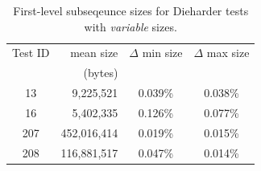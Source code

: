 \documentclass[
  digital,     %
  oneside,     %
  nosansbold,  %
  nocolorbold, %
  nolof,         %
  nolot,         %
]{fithesis4}
\begin{document}
\begin{table}[h]
  \begin{tabularx}{0.7\textwidth}{c|r|c|c}
    Test ID & mean size & $\Delta$ min size & $\Delta$ max size\\
     & (bytes) & & \\
    \midrule
    13 & 9,225,521 & 0.039\% & 0.038\%\\
    16 & 5,402,335 & 0.126\% & 0.077\%\\
    207 & 452,016,414 & 0.019\% & 0.015\%\\
    208 & 116,881,517 & 0.047\% & 0.014\%\\
 
  \end{tabularx}
  \caption{First-level subseqeunce sizes for Dieharder tests with \emph{variable} sizes.}
  \label{tab:analysis_dieharder_variable}
\end{table}

\newpage
\end{document}
